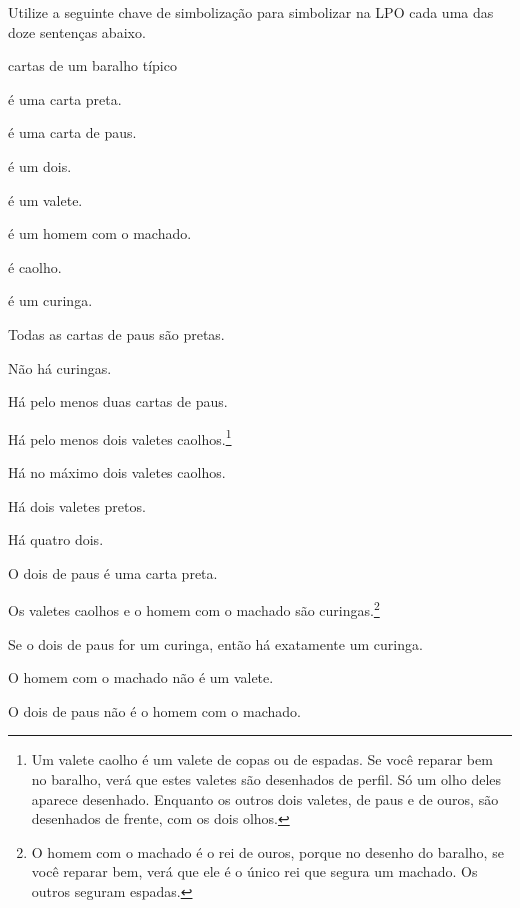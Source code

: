 \solutions
\problempart
\label{pr.FOLcards}
Utilize a seguinte chave de simbolização para simbolizar na LPO cada uma das doze sentenças abaixo.
\begin{center}
\begin{ekey}
\item[\text{domínio}] cartas de um baralho típico
\item[\atom{R}{x}]  é uma carta preta.
\item[\atom{P}{x}]  é uma carta de paus.
\item[\atom{D}{x}]  é um dois.
\item[\atom{V}{x}]  é um valete.
\item[\atom{M}{x}]  é um homem com o machado.
\item[\atom{C}{x}]  é caolho.
\item[\atom{J}{x}]  é um curinga.
\end{ekey}
\end{center}
\begin{earg}
\item Todas as cartas de paus são pretas.
\item Não há curingas.
\item Há pelo menos duas cartas de paus.
\item Há pelo menos dois valetes caolhos.\footnote{
	Um valete caolho é um valete de copas ou de espadas.
	Se você reparar bem no baralho, verá que estes valetes são desenhados de perfil.
	Só um olho deles aparece desenhado.
	Enquanto os outros dois valetes, de paus e de ouros, são desenhados de frente, com os dois olhos.}
\item Há no máximo dois valetes caolhos.
\item Há dois valetes pretos.
\item Há quatro dois.
\item O dois de paus é uma carta preta.
\item Os valetes caolhos e o homem com o machado são curingas.\footnote{
	O homem com o machado é o rei de ouros, porque no desenho do baralho, se você reparar bem, verá que ele é o único rei que segura um machado. Os outros seguram espadas.}
\item Se o dois de paus for um curinga, então há exatamente um curinga.
\item O homem com o machado não é um valete.
\item O dois de paus não é o homem com o machado.
\end{earg}


